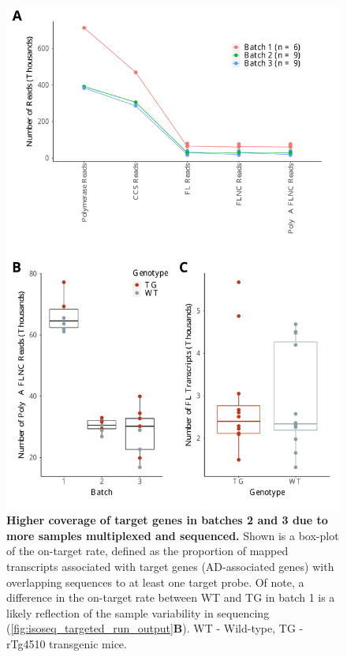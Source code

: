 \begin{figure}[!htp]
	\centering
		\includegraphics[page=2,trim={0 25cm 0 0},clip,scale = 0.55]{Figures/TargetedTranscriptome.pdf}
	\captionsetup{width=0.95\textwidth}
	\caption[On-target rate of Iso-Seq targeted profiling]%
	{\textbf{Higher coverage of target genes in batches 2 and 3 due to more samples multiplexed and sequenced.} Shown is a box-plot of the on-target rate, defined as the proportion of mapped transcripts associated with target genes (AD-associated genes) with overlapping sequences to at least one target probe. Of note, a difference in the on-target rate between WT and TG in batch 1 is a likely reflection of the sample variability in sequencing (\cref{fig:isoseq_targeted_run_output}\textbf{B}). WT - Wild-type, TG - rTg4510 transgenic mice.}
	\label{fig:isoseq_targeted_rate}
\end{figure}

